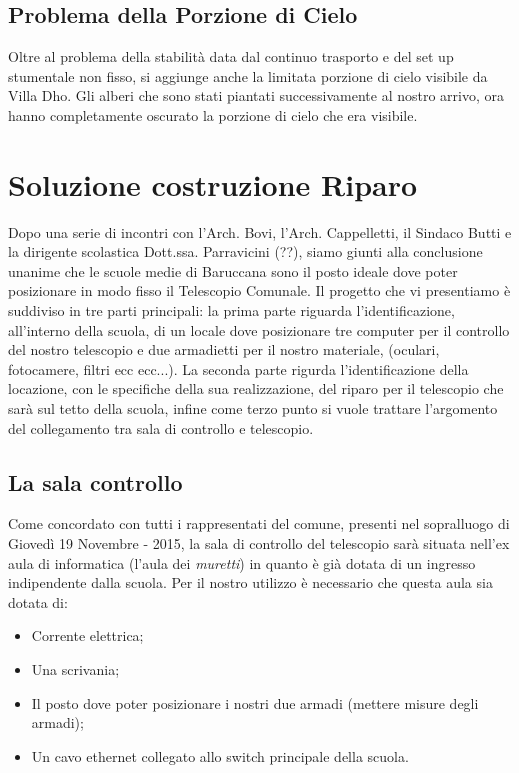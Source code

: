 \documentclass[a4paper,12pt]{article}
\begin{document}
\subsection{Problema della Porzione di Cielo}
Oltre al problema della stabilit\`a data dal continuo trasporto e del set up stumentale non fisso, si aggiunge anche la limitata porzione di cielo visibile da Villa Dho. Gli alberi che sono stati piantati successivamente al nostro arrivo, ora hanno completamente oscurato la porzione di cielo che era visibile.

\section{Soluzione costruzione Riparo}
Dopo una serie di incontri con l'Arch. Bovi, l'Arch. Cappelletti, il Sindaco Butti e la dirigente scolastica Dott.ssa. Parravicini (??), siamo giunti alla conclusione unanime che le scuole medie di Baruccana sono il posto ideale dove poter posizionare in modo fisso il Telescopio Comunale. Il progetto che vi presentiamo \`e suddiviso in tre parti principali: la prima parte riguarda l'identificazione, all'interno della scuola, di un locale dove posizionare tre computer per il controllo del nostro telescopio e due armadietti per il nostro materiale, (oculari, fotocamere, filtri ecc ecc...). La seconda parte rigurda l'identificazione della locazione, con le specifiche
della sua realizzazione, del riparo per il telescopio che sar\`a sul tetto della scuola, infine come terzo punto si vuole trattare l'argomento del collegamento tra sala di controllo e telescopio.
\subsection{La sala controllo}
Come concordato con tutti i rappresentati del comune, presenti nel sopralluogo di Gioved\`i 19 Novembre - 2015, la sala di controllo del telescopio sar\`a situata nell'ex aula di informatica (l'aula dei \textit{muretti}) in quanto \`e gi\`a dotata di un ingresso indipendente dalla scuola. Per il nostro utilizzo \`e necessario che questa aula sia dotata di:
\begin{itemize}
	\item Corrente elettrica;
	\item Una scrivania;
	\item Il posto dove poter posizionare i nostri due armadi (mettere misure degli armadi);	\item Un cavo ethernet collegato allo switch principale della scuola.
\end{itemize}
\end{document}
